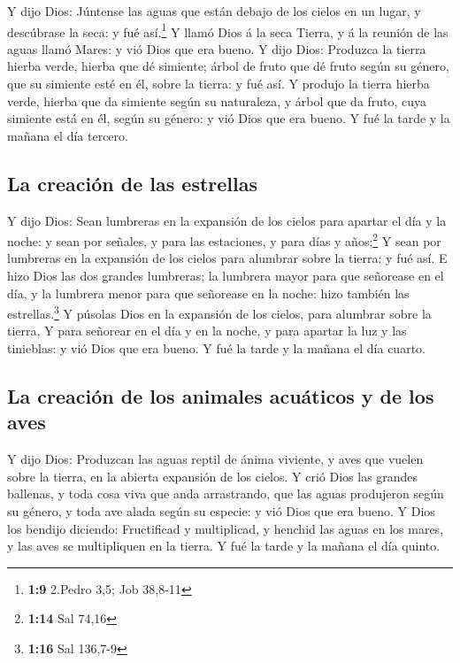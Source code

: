  Y dijo Dios: Júntense las aguas que están debajo de los
cielos en un lugar, y descúbrase la seca: y fué así.\footnote{\textbf{1:9}
  2.Pedro 3,5; Job 38,8-11}  Y llamó Dios á la seca Tierra,
y á la reunión de las aguas llamó Mares: y vió Dios que era bueno.
 Y dijo Dios: Produzca la tierra hierba verde, hierba que
dé simiente; árbol de fruto que dé fruto según su género, que su
simiente esté en él, sobre la tierra: y fué así.  Y produjo
la tierra hierba verde, hierba que da simiente según su naturaleza, y
árbol que da fruto, cuya simiente está en él, según su género: y vió
Dios que era bueno.  Y fué la tarde y la mañana el día
tercero.

\hypertarget{la-creaciuxf3n-de-las-estrellas}{%
\subsection{La creación de las
estrellas}\label{la-creaciuxf3n-de-las-estrellas}}

 Y dijo Dios: Sean lumbreras en la expansión de los cielos
para apartar el día y la noche: y sean por señales, y para las
estaciones, y para días y años;\footnote{\textbf{1:14} Sal 74,16}
 Y sean por lumbreras en la expansión de los cielos para
alumbrar sobre la tierra: y fué así.  E hizo Dios las dos
grandes lumbreras; la lumbrera mayor para que señorease en el día, y la
lumbrera menor para que señorease en la noche: hizo también las
estrellas.\footnote{\textbf{1:16} Sal 136,7-9}  Y púsolas
Dios en la expansión de los cielos, para alumbrar sobre la tierra,
 Y para señorear en el día y en la noche, y para apartar la
luz y las tinieblas: y vió Dios que era bueno.  Y fué la
tarde y la mañana el día cuarto.

\hypertarget{la-creaciuxf3n-de-los-animales-acuuxe1ticos-y-de-los-aves}{%
\subsection{La creación de los animales acuáticos y de los
aves}\label{la-creaciuxf3n-de-los-animales-acuuxe1ticos-y-de-los-aves}}

 Y dijo Dios: Produzcan las aguas reptil de ánima viviente,
y aves que vuelen sobre la tierra, en la abierta expansión de los
cielos.  Y crió Dios las grandes ballenas, y toda cosa viva
que anda arrastrando, que las aguas produjeron según su género, y toda
ave alada según su especie: y vió Dios que era bueno.  Y
Dios los bendijo diciendo: Fructificad y multiplicad, y henchid las
aguas en los mares, y las aves se multipliquen en la tierra.
 Y fué la tarde y la mañana el día quinto.

